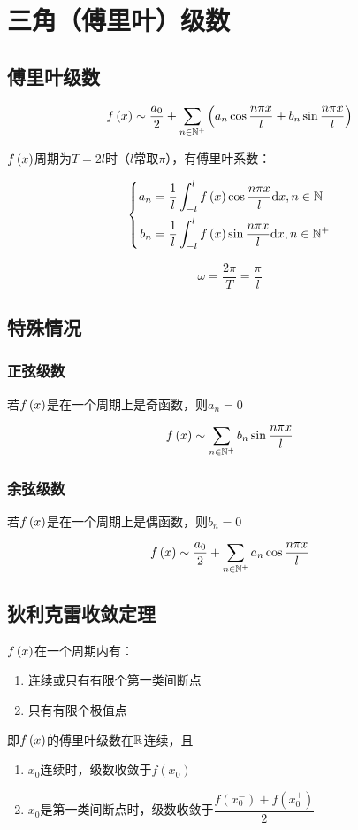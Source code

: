 \documentclass{article}
\begin{document}
\section{三角（傅里叶）级数}

\subsection{傅里叶级数}

\[f\left(x\right)\sim\frac{a_0}2+\sum_{n\in\mathbb N^+}\left(a_n\cos\frac{n\pi x}l+b_n\sin\frac{n\pi x}l\right)\]

$f\left(x\right)$周期为$T=2l$时（$l$常取$\pi$），有傅里叶系数：

\[\left\{\begin{aligned}
        a_n & =\frac1l\int_{-l}^lf\left(x\right)\cos\frac{n\pi x}l\mathrm d x,n\in\mathbb N  \\
        b_n & =\frac1l\int_{-l}^lf\left(x\right)\sin\frac{n\pi x}l\mathrm d x,n\in\mathbb N^+
    \end{aligned}\right.\]

\[\omega=\frac{2\pi}T=\frac\pi l\]

\subsection{特殊情况}

\subsubsection{正弦级数}

若$f\left(x\right)$是在一个周期上是奇函数，则$a_n=0$

\[f\left(x\right)\sim\sum_{n\in\mathbb N^+}b_n\sin\frac{n\pi x}l\]

\subsubsection{余弦级数}

若$f\left(x\right)$是在一个周期上是偶函数，则$b_n=0$

\[f\left(x\right)\sim\frac{a_0}2+\sum_{n\in\mathbb N^+}a_n\cos\frac{n\pi x}l\]

\subsection{狄利克雷收敛定理}

$f\left(x\right)$在一个周期内有：

\begin{enumerate}
    \item 连续或只有有限个第一类间断点
    \item 只有有限个极值点
\end{enumerate}

即$f\left(x\right)$的傅里叶级数在$\mathbb R$连续，且

\begin{enumerate}
    \item $x_0$连续时，级数收敛于$f(x_0)$
    \item $x_0$是第一类间断点时，级数收敛于$\dfrac{f(x_0^-)+f(x_0^+)}2$
\end{enumerate}
\end{document}
